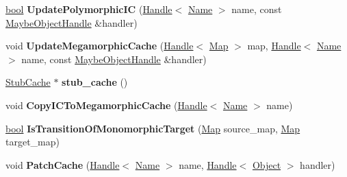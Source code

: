 \begin{DoxyCompactItemize}
\item 
\mbox{\label{classv8_1_1internal_1_1IC_a7cd7c6305060a11db323b42d84d58685}} 
\mbox{\hyperlink{classbool}{bool}} {\bfseries Update\+Polymorphic\+IC} (\mbox{\hyperlink{classv8_1_1internal_1_1Handle}{Handle}}$<$ \mbox{\hyperlink{classv8_1_1internal_1_1Name}{Name}} $>$ name, const \mbox{\hyperlink{classv8_1_1internal_1_1MaybeObjectHandle}{Maybe\+Object\+Handle}} \&handler)
\item 
\mbox{\label{classv8_1_1internal_1_1IC_a914410ef4188cce3198cd4ed5494218f}} 
void {\bfseries Update\+Megamorphic\+Cache} (\mbox{\hyperlink{classv8_1_1internal_1_1Handle}{Handle}}$<$ \mbox{\hyperlink{classv8_1_1internal_1_1Map}{Map}} $>$ map, \mbox{\hyperlink{classv8_1_1internal_1_1Handle}{Handle}}$<$ \mbox{\hyperlink{classv8_1_1internal_1_1Name}{Name}} $>$ name, const \mbox{\hyperlink{classv8_1_1internal_1_1MaybeObjectHandle}{Maybe\+Object\+Handle}} \&handler)
\item 
\mbox{\label{classv8_1_1internal_1_1IC_a662830d348f7719272d576802879080e}} 
\mbox{\hyperlink{classv8_1_1internal_1_1StubCache}{Stub\+Cache}} $\ast$ {\bfseries stub\+\_\+cache} ()
\item 
\mbox{\label{classv8_1_1internal_1_1IC_aa7a45201b57aadcc703589595732dd27}} 
void {\bfseries Copy\+I\+C\+To\+Megamorphic\+Cache} (\mbox{\hyperlink{classv8_1_1internal_1_1Handle}{Handle}}$<$ \mbox{\hyperlink{classv8_1_1internal_1_1Name}{Name}} $>$ name)
\item 
\mbox{\label{classv8_1_1internal_1_1IC_a2b3e1d61d5e88fd6f77b2eaa916eddcd}} 
\mbox{\hyperlink{classbool}{bool}} {\bfseries Is\+Transition\+Of\+Monomorphic\+Target} (\mbox{\hyperlink{classv8_1_1internal_1_1Map}{Map}} source\+\_\+map, \mbox{\hyperlink{classv8_1_1internal_1_1Map}{Map}} target\+\_\+map)
\item 
\mbox{\label{classv8_1_1internal_1_1IC_a6f12542cb9e1d2674f3eaf2e228f8e9a}} 
void {\bfseries Patch\+Cache} (\mbox{\hyperlink{classv8_1_1internal_1_1Handle}{Handle}}$<$ \mbox{\hyperlink{classv8_1_1internal_1_1Name}{Name}} $>$ name, \mbox{\hyperlink{classv8_1_1internal_1_1Handle}{Handle}}$<$ \mbox{\hyperlink{classv8_1_1internal_1_1Object}{Object}} $>$ handler)

\end{DoxyCompactItemize}
